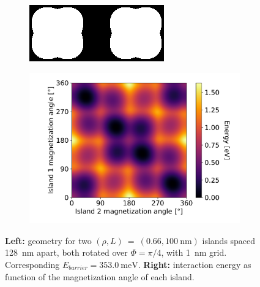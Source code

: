 \documentclass[11pt,a4paper,english]{article}
\begin{document}
\begin{figure}
    \centering
    \begin{subfigure}[c]{4cm} %
         \centering
         \includegraphics[width=\textwidth]{Figures/two_islands/Geometry/geom_r0.66_s100_d128_aPi4,Pi4_cell1nm.png}
     \end{subfigure}
    \begin{subfigure}[c]{0.7\columnwidth}
         \centering
         \includegraphics[width=\textwidth]{Figures/two_islands/EnergyLandscape/Int_aPi4,Pi4_d128_r0.66,0.66_cell1nm.pdf}
     \end{subfigure}
    \caption{\textbf{Left:} geometry for two $(\rho, L)~=~(0.66, \SI{100}{\nano\metre})$ islands spaced \SI{128}{\nano\metre} apart, both rotated over $\Phi=\pi/4$, with \SI{1}{\nano\metre} grid. Corresponding $E_{barrier}=\SI{353.0}{\milli\electronvolt}$. \textbf{Right:} interaction energy as function of the magnetization angle of each island.}
    \label{fig:two-islands_interaction_(r0.66_L100)_aPi4andPi4}
\end{figure}
\end{document}
